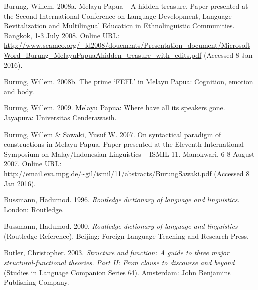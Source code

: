 \begin{styleCitaviBibliographyEntry}
Burung, Willem. 2008a. Melayu Papua – A hidden treasure. Paper presented at the Second International Conference on Language Development, Language Revitalization and Multilingual Education in Ethnolinguistic Communities. Bangkok, 1-3 July 2008. Online URL: \url{http://www.seameo.org/_ld2008/doucments/Presentation_document/MicrosoftWord_Burung_MelayuPapuaAhidden_treasure_with_edits.pdf} (Accessed 8 Jan 2016).
\end{styleCitaviBibliographyEntry}

\begin{styleCitaviBibliographyEntry}
Burung, Willem. 2008b. The prime ‘FEEL’ in Melayu Papua: Cognition, emotion and body.
\end{styleCitaviBibliographyEntry}

\begin{styleCitaviBibliographyEntry}
Burung, Willem. 2009. Melayu Papua: Where have all its speakers gone. Jayapura: Universitas Cenderawasih.
\end{styleCitaviBibliographyEntry}

\begin{styleCitaviBibliographyEntry}
Burung, Willem \& Sawaki, Yusuf W. 2007. On syntactical paradigm of  constructions in Melayu Papua. Paper presented at the Eleventh International Symposium on Malay/Indonesian Linguistics – ISMIL 11. Manokwari, 6-8 August 2007. Online URL: \url{http://email.eva.mpg.de/~gil/ismil/11/abstracts/BurungSawaki.pdf} (Accessed 8 Jan 2016).
\end{styleCitaviBibliographyEntry}

\begin{styleCitaviBibliographyEntry}
Bussmann, Hadumod. 1996. \textit{Routledge dictionary of language and linguistics}. London: Routledge.
\end{styleCitaviBibliographyEntry}

\begin{styleCitaviBibliographyEntry}
Bussmann, Hadumod. 2000. \textit{Routledge dictionary of language and linguistics} (Routledge Reference). Beijing: Foreign Language Teaching and Research Press.
\end{styleCitaviBibliographyEntry}

\begin{styleCitaviBibliographyEntry}
Butler, Christopher. 2003. \textit{Structure and function: A guide to three major structural-functional theories. Part II: From clause to discourse and beyond} (Studies in Language Companion Series 64). Amsterdam: John Benjamins Publishing Company.
\end{styleCitaviBibliographyEntry}

